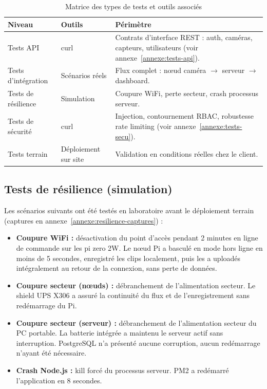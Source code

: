 \documentclass[12pt,a4paper]{article}
\begin{document}
\begin{table}[H]
\centering
\small
\renewcommand{\arraystretch}{1.2}
\begin{tabular}{|l|l|p{7.5cm}|}
\hline
\textbf{Niveau} & \textbf{Outils} & \textbf{Périmètre} \\
\hline
Tests API & curl & Contrats d'interface REST : auth, caméras, capteurs, utilisateurs (voir annexe~\ref{annexe:tests-api}). \\
\hline
Tests d'intégration & Scénarios réels & Flux complet : nœud caméra $\rightarrow$ serveur $\rightarrow$ dashboard. \\
\hline
Tests de résilience & Simulation & Coupure WiFi, perte secteur, crash processus serveur. \\
\hline
Tests de sécurité & curl & Injection, contournement RBAC, robustesse rate limiting (voir annexe~\ref{annexe:tests-secu}). \\
\hline
Tests terrain & Déploiement sur site & Validation en conditions réelles chez le client. \\
\hline
\end{tabular}
\caption{Matrice des types de tests et outils associés}
\end{table}

\subsection{Tests de résilience (simulation)}

Les scénarios suivants ont été testés en laboratoire avant le déploiement terrain (captures en annexe~\ref{annexe:resilience-captures}) :

\begin{itemize}[label=\textbullet]
    \item \textbf{Coupure WiFi :} désactivation du point d'accès pendant 2 minutes en ligne de commande sur les pi zero 2W. Le nœud Pi a basculé en mode hors ligne en moins de 5 secondes, enregistré les clips localement, puis les a uploadés intégralement au retour de la connexion, sans perte de données.
    \item \textbf{Coupure secteur (nœuds) :} débranchement de l'alimentation secteur. Le shield UPS X306 a assuré la continuité du flux et de l'enregistrement sans redémarrage du Pi.
    \item \textbf{Coupure secteur (serveur) :} débranchement de l'alimentation secteur du PC portable. La batterie intégrée a maintenu le serveur actif sans interruption. PostgreSQL n'a présenté aucune corruption, aucun redémarrage n'ayant été nécessaire.
    \item \textbf{Crash Node.js :} kill forcé du processus serveur. PM2 a redémarré l'application en 8 secondes.
\end{itemize}
\end{document}
